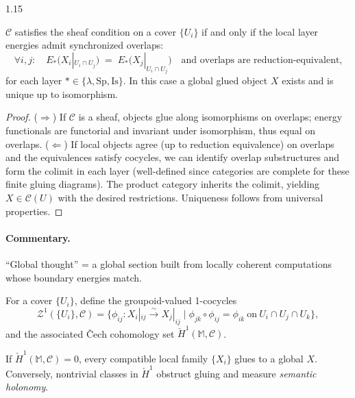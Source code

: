 \documentclass[12pt,a4paper]{article}
\begin{document}
\begin{spacing}{1.15}
\begin{theorem}
\label{thm:sheaf-gluing}
$\mathscr{C}$ satisfies the sheaf condition on a cover $\{U_i\}$ if and only if the local layer energies admit synchronized overlaps:
\[
\forall i,j:\quad
E_{*}\big(X_i|_{U_i\cap U_j}\big) \;=\; E_{*}\big(X_j|_{U_i\cap U_j}\big)
\quad \text{and overlaps are reduction-equivalent,}
\]
for each layer $*\in\{\lambda,\mathrm{Sp},\mathrm{Is}\}$. In this case a global glued object $X$ exists and is unique up to isomorphism.
\end{theorem}

\begin{proof}
($\Rightarrow$) If $\mathscr{C}$ is a sheaf, objects glue along isomorphisms on overlaps; energy functionals are functorial and invariant under isomorphism, thus equal on overlaps. ($\Leftarrow$) If local objects agree (up to reduction equivalence) on overlaps and the equivalences satisfy cocycles, we can identify overlap substructures and form the colimit in each layer (well-defined since categories are complete for these finite gluing diagrams). The product category inherits the colimit, yielding $X\in\mathscr{C}(U)$ with the desired restrictions. Uniqueness follows from universal properties.
\end{proof}

\paragraph{Commentary.}
“Global thought” = a global section built from locally coherent computations whose boundary energies match.

\begin{definition}
For a cover $\{U_i\}$, define the groupoid-valued 1-cocycles
\[
\mathcal{Z}^{1}(\{U_i\},\mathscr{C})
= \Big\{\phi_{ij}: X_i|_{ij}\xrightarrow{\sim} X_j|_{ij}\;\Big|\;\phi_{jk}\circ\phi_{ij}=\phi_{ik}\ \text{on}\ U_i\cap U_j\cap U_k\Big\},
\]
and the associated Čech cohomology set $\check{H}^{1}(\mathbb{M},\mathscr{C})$.
\end{definition}

\begin{proposition}
\label{prop:vanish}
If $\check{H}^{1}(\mathbb{M},\mathscr{C})=0$, every compatible local family $\{X_i\}$ glues to a global $X$. Conversely, nontrivial classes in $\check{H}^{1}$ obstruct gluing and measure \emph{semantic holonomy}.
\end{proposition}


\end{spacing}
\end{document}
